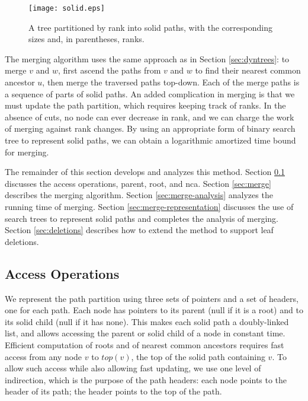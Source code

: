 \documentclass[twoside,leqno,twocolumn]{article}
\newcommand{\topn}{\mathit{top}}
\begin{document}
\begin{figure} [htb]
\addtolength{\abovecaptionskip}{-.5cm}
\begin{center}
\resizebox{0.5\textwidth}{!} {\texttt{[image: solid.eps]}}
\end{center}
\caption{\label{fig:solid} A tree partitioned by rank into solid
paths, with the corresponding sizes and, in parentheses, ranks.}
\end{figure}



The merging algorithm uses the same approach as in Section \ref{sec:dyntrees}: to merge $v$ and $w$, first ascend the paths from $v$ and $w$ to find their nearest common ancestor $u$, then merge the traversed paths top-down. Each of the merge paths is a sequence of parts of solid paths.  An added complication in merging is that we must update the path partition, which requires keeping track of ranks.  In the absence of cuts, no node can ever decrease in rank, and we can charge the work of merging against rank changes.  By using an appropriate form of binary search tree to represent solid paths, we can obtain a logarithmic amortized time bound for merging.



The remainder of this section develops and analyzes this method. Section \ref{sec:nca} discusses the access operations, parent, root, and nca. Section \ref{sec:merge} describes the merging algorithm. Section \ref{sec:merge-analysis} analyzes the running time of merging. Section \ref{sec:merge-representation} discusses the use of search trees to represent solid paths and completes the analysis of merging. Section \ref{sec:deletions} describes how to extend the method to support leaf deletions.


\subsection{Access Operations}
\label{sec:nca}

We represent the path partition using three sets of pointers and a set of headers, one for each path.  Each node has pointers to its parent (null if it is a root) and to its solid child (null if it has none).  This makes each solid path a doubly-linked list, and allows accessing the parent or solid child of a node in constant time.  Efficient computation of roots and of nearest common ancestors requires fast access from any node $v$ to $\topn(v)$, the top of the solid path containing $v$.  To allow such access while also allowing fast updating, we use one level of indirection, which is the purpose of the path headers:  each node points to the header of its path; the header points to the top of the path.
\end{document}
